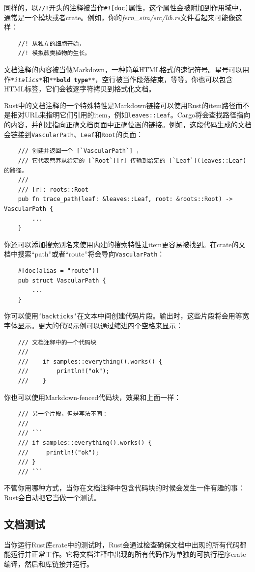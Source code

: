 同样的，以\texttt{//!}开头的注释被当作\texttt{\#![doc]}属性，这个属性会被附加到作用域中，通常是一个模块或者crate。例如，你的\emph{fern\_sim/src/lib.rs}文件看起来可能像这样：
\begin{verbatim}
    //! 从独立的细胞开始，
    //! 模拟蕨类植物的生长。
\end{verbatim}

文档注释的内容被当做Markdown，一种简单HTML格式的速记符号。星号可以用作\texttt{*\emph{italics}*}和\texttt{**\textbf{bold type}**}，空行被当作段落结束，等等。你也可以包含HTML标签，它们会被逐字符拷贝到格式化文档。

Rust中的文档注释的一个特殊特性是Markdown链接可以使用Rust的item路径而不是相对URL来指明它们引用的item，例如\texttt{leaves::Leaf}。Cargo将会查找路径指向的内容，并创建指向正确文档页面中正确位置的链接。例如，这段代码生成的文档会链接到\texttt{VascularPath}、\texttt{Leaf}和\texttt{Root}的页面：
\begin{verbatim}
    /// 创建并返回一个 [`VascularPath`] ，
    /// 它代表营养从给定的 [`Root`][r] 传输到给定的 [`Leaf`](leaves::Leaf) 的路径。
    ///
    /// [r]: roots::Root
    pub fn trace_path(leaf: &leaves::Leaf, root: &roots::Root) -> VascularPath {
        ...
    }
\end{verbatim}

你还可以添加搜索别名来使用内建的搜索特性让item更容易被找到。在crate的文档中搜索“path”或者“route”将会导向\texttt{VascularPath}：
\begin{verbatim}
    #[doc(alias = "route")]
    pub struct VascularPath {
        ...
    }
\end{verbatim}

你可以使用\texttt{`backticks`}在文本中间创建代码片段。输出时，这些片段将会用等宽字体显示。更大的代码示例可以通过缩进四个空格来显示：
\begin{verbatim}
    /// 文档注释中的一个代码块
    ///
    ///    if samples::everything().works() {
    ///        println!("ok");
    ///    }
\end{verbatim}
你也可以使用Markdown-fenced代码块，效果和上面一样：
\begin{verbatim}
    /// 另一个片段，但是写法不同：
    /// 
    /// ```
    /// if samples::everything().works() {
    ///     println!("ok");
    /// }
    /// ```
\end{verbatim}

不管你用哪种方式，当你在文档注释中包含代码块的时候会发生一件有趣的事：Rust会自动把它当做一个测试。

\subsection{文档测试}
当你运行Rust库crate中的测试时，Rust会通过检查确保文档中出现的所有代码都能运行并正常工作。它将文档注释中出现的所有代码作为单独的可执行程序crate编译，然后和库链接并运行。

